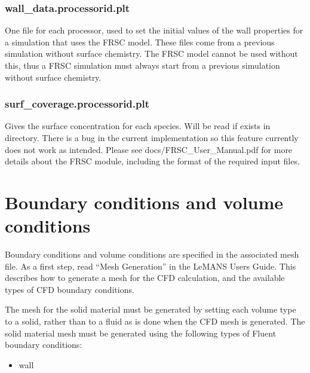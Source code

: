 \documentclass[]{article}
\begin{document}
\subsubsection{wall\_data.processorid.plt}
One file for each processor, used to set the initial values of the wall properties for a simulation that uses the FRSC model.  These files come from a previous simulation without surface chemistry.  The FRSC model cannot be used without this, thus a FRSC simulation must always start from a previous simulation without surface chemistry.  

\subsubsection{surf\_coverage.processorid.plt}
Gives the surface concentration for each species.  Will be read if exists in directory.  There is a bug in the current implementation so this feature currently does not work as intended.
\newline
\newline
Please see docs/FRSC\_User\_Manual.pdf for more details about the FRSC module, including the format of the required input files.

\section{Boundary conditions and volume conditions}\label{sec:bcs}

Boundary conditions and volume conditions are specified in the associated mesh file.    As a first step, read ``Mesh Generation'' in the LeMANS Users Guide.  This describes how to generate a mesh for the CFD calculation, and the available types of CFD boundary conditions.  

The mesh for the solid material must be generated by setting each volume type to a solid, rather than to a fluid as is done when the CFD mesh is generated.  The solid material mesh must be generated using the following types of Fluent boundary conditions:

\begin{itemize}
 \item wall
\end{itemize}
\end{document}
